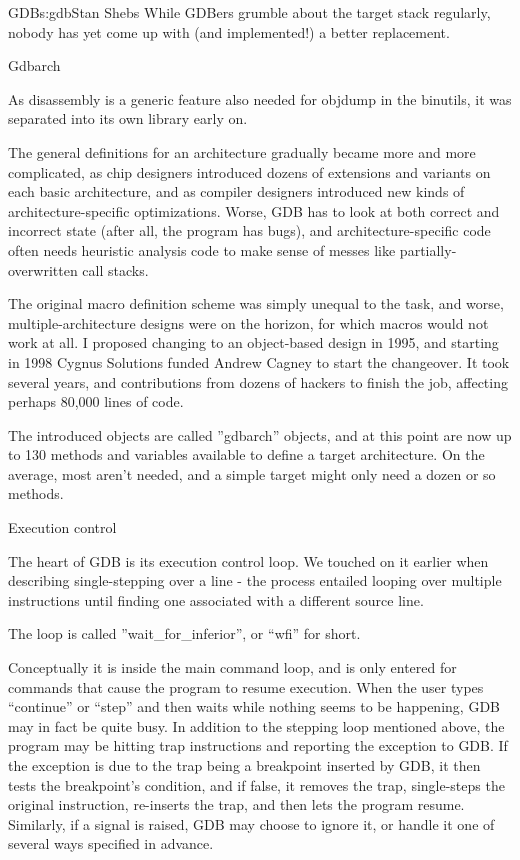 \begin{aosachapter}{GDB}{s:gdb}{Stan Shebs}
While GDBers grumble about the target stack regularly, nobody has yet
come up with (and implemented!) a better replacement.

Gdbarch

As disassembly is a generic feature also needed for objdump in the
binutils, it was separated into its own library early on.

The general definitions for an architecture gradually became more and
more complicated, as chip designers introduced dozens of extensions
and variants on each basic architecture, and as compiler designers
introduced new kinds of architecture-specific optimizations.  Worse,
GDB has to look at both correct and incorrect state (after all, the
program has bugs), and architecture-specific code often needs
heuristic analysis code to make sense of messes like
partially-overwritten call stacks.

The original macro definition scheme was simply unequal to the task,
and worse, multiple-architecture designs were on the horizon, for
which macros would not work at all.  I proposed changing to an
object-based design in 1995, and starting in 1998 Cygnus Solutions
funded Andrew Cagney to start the changeover.  It took several years,
and contributions from dozens of hackers to finish the job, affecting
perhaps 80,000 lines of code.

The introduced objects are called ''gdbarch'' objects, and at this
point are now up to 130 methods and variables available to define a
target architecture.  On the average, most aren't needed, and a
simple target might only need a dozen or so methods.

Execution control

The heart of GDB is its execution control loop.  We touched on it earlier
when describing single-stepping over a line - the process entailed looping
over multiple instructions until finding one associated with a different
source line.

The loop is called ''wait_for_inferior'', or ``wfi'' for short.

Conceptually it is inside the main command loop, and is only entered for
commands that cause the program to resume execution.  When the user types
``continue'' or ``step'' and then waits while nothing seems to be happening,
GDB may in fact be quite busy.  In addition to the stepping loop mentioned
above, the program may be hitting trap instructions and reporting the exception
to GDB.  If the exception is due to the trap being a breakpoint inserted by
GDB, it then tests the breakpoint's condition, and if false, it removes the
trap, single-steps the original instruction, re-inserts the trap, and then
lets the program resume.  Similarly, if a signal is raised, GDB may choose
to ignore it, or handle it one of several ways specified in advance.


\end{aosachapter}
